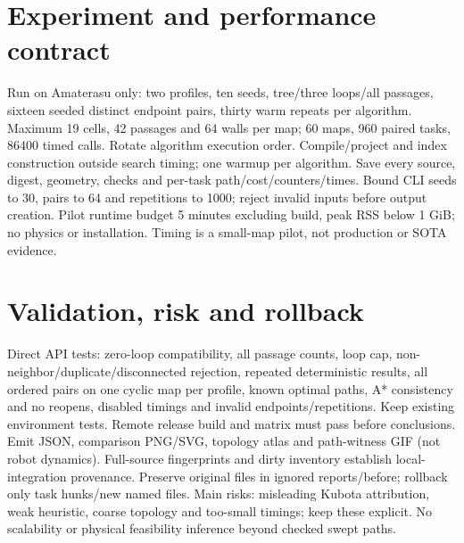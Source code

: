 \documentclass{article}
\begin{document}
\section*{Experiment and performance contract}
Run on Amaterasu only: two profiles, ten seeds, tree/three loops/all passages, sixteen seeded distinct endpoint pairs, thirty warm repeats per algorithm. Maximum 19 cells, 42 passages and 64 walls per map; 60 maps, 960 paired tasks, 86400 timed calls. Rotate algorithm execution order. Compile/project and index construction outside search timing; one warmup per algorithm. Save every source, digest, geometry, checks and per-task path/cost/counters/times. Bound CLI seeds to 30, pairs to 64 and repetitions to 1000; reject invalid inputs before output creation. Pilot runtime budget 5 minutes excluding build, peak RSS below 1 GiB; no physics or installation. Timing is a small-map pilot, not production or SOTA evidence.
\section*{Validation, risk and rollback}
Direct API tests: zero-loop compatibility, all passage counts, loop cap, non-neighbor/duplicate/disconnected rejection, repeated deterministic results, all ordered pairs on one cyclic map per profile, known optimal paths, A* consistency and no reopens, disabled timings and invalid endpoints/repetitions. Keep existing environment tests. Remote release build and matrix must pass before conclusions. Emit JSON, comparison PNG/SVG, topology atlas and path-witness GIF (not robot dynamics). Full-source fingerprints and dirty inventory establish local-integration provenance. Preserve original files in ignored reports/before; rollback only task hunks/new named files. Main risks: misleading Kubota attribution, weak heuristic, coarse topology and too-small timings; keep these explicit. No scalability or physical feasibility inference beyond checked swept paths.

\end{document}
